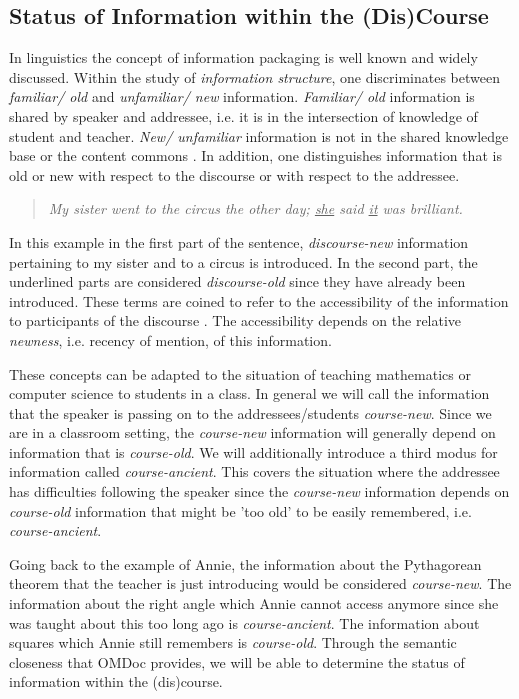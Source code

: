 \documentclass{llncs}
\begin{document}
\subsection{Status of Information within the (Dis)Course}
\label{sec:infostatus}
In linguistics the concept of information packaging \cite{CambridgeGrammar:npentrel14} is well known and widely discussed. Within the study of \textit{information structure}, one discriminates between \textit{familiar/ old} and \textit{unfamiliar/ new} information. \textit{Familiar/ old} information is shared by speaker and addressee, i.e. it is in the intersection of knowledge of student and teacher. \textit{New/ unfamiliar} information is not in the shared knowledge base or the content commons \cite{CNX:whitepaper}. In addition, one distinguishes information that is old or new with respect to the discourse or with respect to the addressee.

\begin{quote}\em
  My sister went to the circus the other day; \underline{she} said \underline{it} was
  brilliant.
\end{quote}

In this example in the first part of the sentence, \textit{discourse-new} information pertaining to my sister and to a circus is introduced. In the second part, the underlined parts are considered \textit{discourse-old} since they have already been introduced. These terms are coined to refer to the accessibility of the information to participants of the discourse \cite{Newness:npentrel14}. The accessibility depends on the relative \textit{newness}, i.e. recency of mention, of this information.

These concepts can be adapted to the situation of teaching mathematics or computer science to students in a class. In general we will call the information that the speaker is passing on to the addressees/students \textit{course-new}. Since we are in a classroom setting, the \textit{course-new} information will generally depend on information that is \textit{course-old}. We will additionally introduce a third modus for information called \textit{course-ancient}. This covers the situation where the addressee has difficulties following the speaker since the \textit{course-new} information depends on \textit{course-old} information that might be 'too old' to be easily remembered, i.e. \textit{course-ancient}.

Going back to the example of Annie, the information about the Pythagorean theorem that the teacher is just introducing would be considered \textit{course-new}. The information about the right angle which Annie cannot access anymore since she was taught about this too long ago is \textit{course-ancient}. The information about squares which Annie still remembers is \textit{course-old}. Through the semantic closeness that OMDoc provides, we will be able to determine the status of information within the (dis)course.
\end{document}
